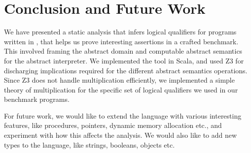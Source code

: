\section{Conclusion and Future Work}

We have presented a static analysis that infers logical qualifiers for programs written in \lang, that helps us prove interesting assertions in a crafted benchmark. 
This involved framing the abstract domain and computable abstract semantics for the abstract interpreter.
We implemented the tool in Scala, and used Z3 for discharging implications required for the different abstract semantics operations.
Since Z3 does not handle multiplication efficiently, we implemented a simple theory of multiplication for the specific set of logical qualifiers we used in our benchmark programs.

For future work, we would like to extend the language with various interesting features, like procedures, pointers, dynamic memory allocation etc., and experiment with how this affects the analysis.
We would also like to add new types to the language, like strings, booleans, objects etc.